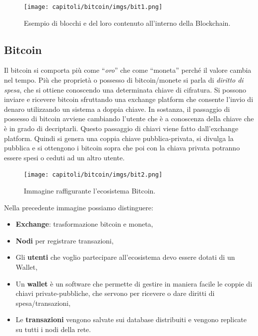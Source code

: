 \begin{figure}[H]
    \centering
    \texttt{[image: capitoli/bitcoin/imgs/bit1.png]}
    \caption{Esempio di blocchi e del loro contenuto all'interno della Blockchain.}
\end{figure}

\subsection{Bitcoin}

Il bitcoin si comporta più come ``\textit{oro}'' che come ``moneta'' perché il
valore cambia nel tempo. Più che proprietà o possesso di bitcoin/monete si parla
di \textit{diritto di spesa}, che si ottiene conoscendo una determinata chiave
di cifratura. Si possono inviare e ricevere bitcoin sfruttando una exchange
platform che consente l'invio di denaro utilizzando un sistema a doppia chiave.
In sostanza, il passaggio di possesso di bitcoin avviene cambiando l'utente che
è a conoscenza della chiave che è in grado di decriptarli. Questo passaggio di
chiavi viene fatto dall'exchange platform. Quindi si genera una coppia chiave
pubblica-privata, si divulga la pubblica e si ottengono i bitcoin sopra che poi
con la chiava privata potranno essere spesi o ceduti ad un altro utente.

\begin{figure}[H]
    \centering
    \texttt{[image: capitoli/bitcoin/imgs/bit2.png]}
    \caption{Immagine raffigurante l'ecosistema Bitcoin.}
\end{figure}

Nella precedente immagine possiamo distinguere:

\begin{itemize}
    \item \textbf{Exchange}: trasformazione bitcoin e moneta,
    \item \textbf{Nodi} per registrare transazioni,
    \item Gli \textbf{utenti} che voglio partecipare all'ecosistema devo essere
          dotati di un Wallet,
    \item Un \textbf{wallet} è un software che permette
          di gestire in maniera facile le coppie di chiavi private-pubbliche, che
          servono per ricevere o dare diritti di spesa/transazioni,
    \item Le \textbf{transazioni} vengono salvate sui database distribuiti e
          vengono replicate su tutti i nodi della rete.
\end{itemize}

